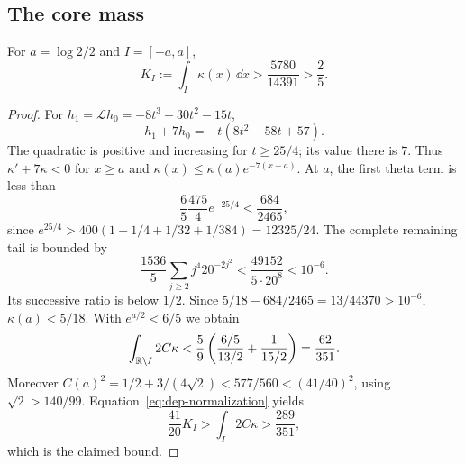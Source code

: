\subsection{The core mass}
\begin{lemma}\label{lem:dep-core-mass}
For $a=\log2/2$ and $I=[-a,a]$,
\[
 K_I:=\int_I\kappa(x)\,\dd x>\frac{5780}{14391}>\frac25.
\]
\end{lemma}
\begin{proof}
For $h_1=\mathscr Lh_0=-8t^3+30t^2-15t$,
\[
 h_1+7h_0=-t(8t^2-58t+57).
\]
The quadratic is positive and increasing for $t\ge25/4$; its value
there is $7$. Thus $\kappa'+7\kappa<0$ for $x\ge a$ and
$\kappa(x)\le\kappa(a)e^{-7(x-a)}$.
At $a$, the first theta term is less than
\[
 \frac65\frac{475}{4}e^{-25/4}<\frac{684}{2465},
\]
since $e^{25/4}>400(1+1/4+1/32+1/384)=12325/24$.
The complete remaining tail is bounded by
\[
 \frac{1536}{5}\sum_{j\ge2}j^4 20^{-2j^2}
 <\frac{49152}{5\cdot20^8}<10^{-6}.
\]
Its successive ratio is below $1/2$. Since
$5/18-684/2465=13/44370>10^{-6}$, $\kappa(a)<5/18$.
With $e^{a/2}<6/5$ we obtain
\[
 \int_{\mathbb R\setminus I}2C\kappa
 <\frac59\left(\frac{6/5}{13/2}+\frac1{15/2}\right)
 =\frac{62}{351}.
\]
Moreover
$C(a)^2=1/2+3/(4\sqrt2)<577/560<(41/40)^2$, using
$\sqrt2>140/99$. Equation~\eqref{eq:dep-normalization} yields
\[
 \frac{41}{20}K_I>\int_I2C\kappa>\frac{289}{351},
\]
which is the claimed bound.
\end{proof}

